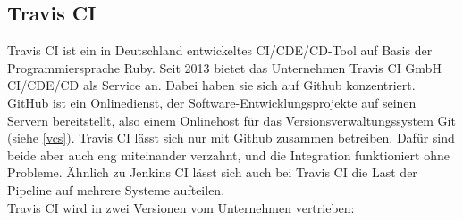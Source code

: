 \subsection{Travis CI}
Travis CI ist ein in Deutschland entwickeltes \ac{CI}/\ac{CDE}/\ac{CD}-Tool auf Basis der Programmiersprache Ruby.\autocite[Vgl.][]{Travis.2019} Seit 2013 bietet das Unternehmen Travis CI GmbH \ac{CI}/\ac{CDE}/\ac{CD} als Service an. Dabei haben sie sich auf Github konzentriert. GitHub ist ein Onlinedienst, der Software-Entwicklungsprojekte auf seinen Servern bereitstellt,\autocite[Vgl.][]{GitHub.2019} also einem Onlinehost für das Versionsverwaltungssystem Git (siehe \ref{vcs}). Travis CI lässt sich nur mit Github zusammen betreiben. Dafür sind beide aber auch eng miteinander verzahnt, und die Integration funktioniert ohne Probleme. Ähnlich zu Jenkins CI lässt sich auch bei Travis CI die Last der Pipeline auf mehrere Systeme aufteilen.\\
Travis CI wird in zwei Versionen vom Unternehmen vertrieben\autocite[Vgl.][]{Travis.2019}:
